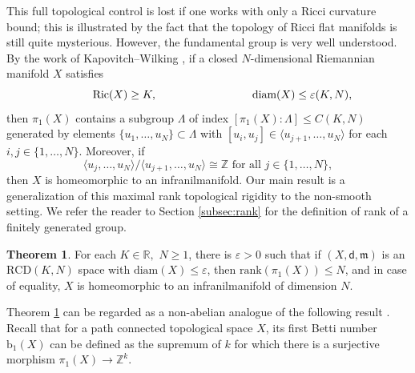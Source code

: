\documentclass[12pt]{amsart}
\theoremstyle{definition}
\newtheorem{mainthm}{Theorem}
\numberwithin{equation}{section}
\newcommand{\rank}{{\text{rank}}}
\newcommand{\diam}{{\text {diam}}}
\newcommand{\bet}{\text{b}_1}
\newcommand{\rcd}{\text{RCD}}
\newcommand{\Ric}{\text{Ric}}
\newcommand{\mm}{\mathfrak{m}}
\begin{document}
This full topological control is lost if one works with only a Ricci curvature bound; this is illustrated by the fact that the topology of Ricci flat manifolds is still quite mysterious. However, the fundamental group is very well understood. By the work of Kapovitch--Wilking \cite{kapovitch-wilking}, if a closed $N$-dimensional Riemannian manifold  $X$ satisfies
\[          \hspace{0.9cm}           \Ric (X)  \geq K , \hspace{3cm} \diam (X) \leq \varepsilon (K,N) , \]
then $\pi_1(X)$ contains a subgroup $\Lambda $ of index $[\pi_1(X): \Lambda ] \leq C ( K , N)$ generated by elements $\{ u_1, \ldots , u_N \} \subset \Lambda $ with $ [u_i , u_j ] \in \langle u_{j+1}, \ldots , u_{N} \rangle $ for each $i,j \in \{ 1, \ldots , N \}$. Moreover, if 
\[    \langle u_j, \ldots , u_N \rangle / \langle u_{j+1}, \ldots  , u_{N} \rangle \cong \mathbb{Z} \text{ for all } j \in \{ 1, \ldots , N \},  \]
then $X$ is homeomorphic to an infranilmanifold. Our main result is a generalization of this maximal rank topological rigidity to the non-smooth setting.  We refer the reader to Section \ref{subsec:rank} for the definition of rank of a finitely generated group.  


\begin {mainthm}\label{thm:max-rank-nilmanifold}
 For each $K \in \mathbb{R},$ $N \geq 1  $, there is $\varepsilon > 0$ such that if $(X,\mathsf{d} ,  \mm ) $ is an $\rcd (K,N)$ space with $\diam (X) \leq \varepsilon $, then $ \rank (\pi_1(X))  \leq N $, and in case of equality, $X$ is homeomorphic to an infranilmanifold of dimension $N$. 
\end{mainthm}







Theorem \ref{thm:max-rank-nilmanifold} can be regarded as a non-abelian analogue of the following result \cite[Theorem 1.2.3]{mondello-mondino-perales}. Recall that for a path connected topological space $X$, its first Betti number $\bet (X)$  can be  defined as the supremum of $k $ for which there is a surjective morphism $\pi_1(X) \to \mathbb{Z}^k$.
\end{document}
